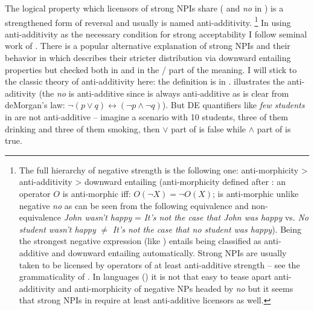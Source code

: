 \documentclass[output=paper, colorlinks, citecolor=brown, newtxmath]{langsci/langscibook}
\begin{document}
\ea\label{ex-18} 
\label{ex-18-b}
\z
\z

\noindent The logical property which licensors of strong NPIs share ( and \textit{no} in ) is a strengthened form of  reversal and usually is named anti-additivity.%
\footnote{The full hierarchy of negative strength is the following one: anti-morphicity > anti-additivity > downward entailing (anti-morphicity defined after \citealt{krifka1995semantics}: an operator $O$ is anti-morphic iff: $O(\neg X)=\neg O(X)$;  is anti-morphic unlike  negative  \textit{no} as can be seen from the following equivalence and non-equivalence \textit{John wasn't happy} = \textit{It's not the case that John was happy} vs. \textit{No student wasn't happy} $\neq$ \textit{It's not the case that no student was happy}). Being the strongest negative expression (like ) entails being classified as anti-additive and downward entailing automatically. Strong NPIs are usually taken to be licensed by operators of at least anti-additive strength -- see the grammaticality of . In  languages () it is not that easy to tease apart anti-additivity and anti-morphicity of negative NPs headed by \textit{no} but it seems that strong NPIs in  require at least anti-additive licensors as well.}
In using anti-additivity as the necessary condition for strong  acceptability I follow seminal work of \cite{zwarts1998three}. There is a popular alternative explanation of strong NPIs and their behavior in \cite{gajewski2011licensing} which describes their stricter distribution via downward entailing properties but checked both in  and in the / part of the meaning. I will stick to the classic theory of anti-additivity here: the definition is in .  illustrates the anti-aditivity (the  \textit{no} is anti-additive since  is always anti-additive as is clear from deMorgan's law: $\neg(p \vee q) \leftrightarrow (\neg p \wedge \neg q)$). But DE quantifiers like \textit{few students} in  are not anti-additive -- imagine a scenario with 10 students, three of them drinking and three of them smoking, then $\vee$ part of  is false while $\wedge$ part of  is true.%
\end{document}
